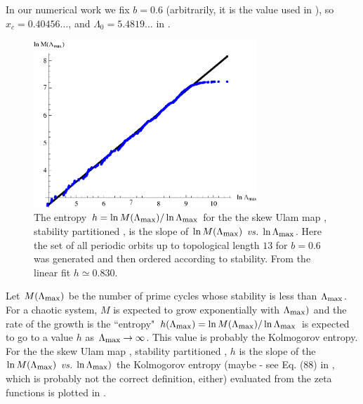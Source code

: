 In our numerical work we fix  $b=0.6$ (arbitrarily,
it is the value used in ), so
$x_c =0.40456\dots$, and $\Lambda_0 = 5.4819\dots$ in
.

\begin{figure}
\begin{center}
	\includegraphics[width=0.75\textwidth]{figs/skewUlamEntropy.eps}
\end{center}
\caption{
    {\small
The entropy $h = \ln M(\stabCutoff)/\ln\stabCutoff$ for the
the skew Ulam map , stability partitioned \statesp,
is the slope of $\ln M( \stabCutoff)$ {\em vs.} $\ln \stabCutoff$.
Here the set of all periodic orbits up to topological length $13$ for $b=0.6$ 
was generated and then ordered according to stability. From the linear
fit $h\simeq 0.830$. 
        }}
\label{fig:logStabOrder1}
\end{figure}

Let $M(\stabCutoff)$ 
be the number of prime cycles whose stability is less than $\stabCutoff$. 
For a chaotic system, $M$ is expected to grow exponentially with $ \stabCutoff)$ and
the rate of the growth is the
``entropy" $h (\stabCutoff) = \ln M(\stabCutoff)/\ln\stabCutoff$
is expected to go to a value $h$ as $\stabCutoff \to \infty$.
This value is probably the Kolmogorov entropy.
For the
the skew Ulam map , stability
partitioned \statesp,
$h$ is the slope of
the $\ln M(\stabCutoff)$ {\em vs.}
$\ln \stabCutoff)$
the Kolmogorov entropy (maybe - see Eq. (88) in , which
is probably not the correct definition, either) evaluated from
the zeta functions  is plotted in .

